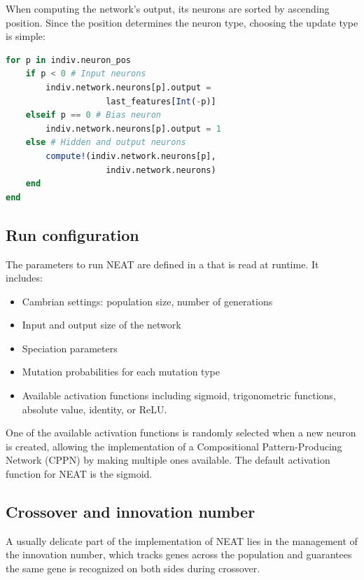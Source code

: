 When computing the network's output, its neurons are sorted by ascending position. Since the position determines the neuron type, choosing the update type is simple:

\begin{minipage}{\linewidth}
\begin{lstlisting}[language=Julia, caption=NEAT network processing (\href{https://github.com/TemplierPaul/NeuroEvolution.jl/blob/master/src/process.jl}{\color{blue}{Source}})]
for p in indiv.neuron_pos
    if p < 0 # Input neurons
        indiv.network.neurons[p].output = 
                    last_features[Int(-p)]
    elseif p == 0 # Bias neuron
        indiv.network.neurons[p].output = 1
    else # Hidden and output neurons
        compute!(indiv.network.neurons[p], 
                    indiv.network.neurons)
    end
end
\end{lstlisting}
\end{minipage}

\subsection{Run configuration}

The parameters to run NEAT are defined in a \href{https://github.com/TemplierPaul/NeuroEvolution.jl/blob/master/cfg/test.yaml}{\color{blue}{YAML file}}  that is read at runtime. It includes:

\begin{itemize}
    \item Cambrian settings: population size, number of generations
    \item Input and output size of the network
    \item Speciation parameters
    \item Mutation probabilities for each mutation type
    \item Available activation functions including sigmoid, trigonometric functions, absolute value, identity, or ReLU. 
\end{itemize}

One of the available activation functions is randomly selected when a new neuron is created, allowing the implementation of a Compositional Pattern-Producing Network (CPPN) by making multiple ones available. The default activation function for NEAT is the sigmoid. 

\subsection{Crossover and innovation number}
A usually delicate part of the implementation of NEAT lies in the management of the innovation number, which tracks genes across the population and guarantees the same gene is recognized on both sides during crossover.

